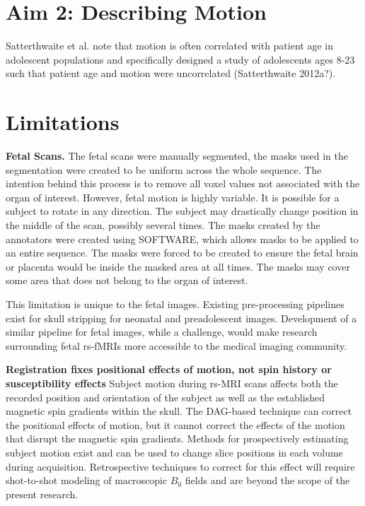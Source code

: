 \section{Aim 2: Describing Motion}

Satterthwaite et al. note that motion is often correlated with patient age in adolescent populations and specifically designed a study of adolescents ages 8-23 such that patient age and motion were uncorrelated (Satterthwaite 2012a?).

\section{Limitations}

\textbf{Fetal Scans.} The fetal scans were manually segmented, the masks used in the segmentation were created to be uniform across the whole sequence. The intention behind this process is to remove all voxel values not associated with the organ of interest. However, fetal motion is highly variable. It is possible for a subject to rotate in any direction. The subject may drastically change position in the middle of the scan, possibly several times. The masks created by the annotators were created using  SOFTWARE, which allows masks to be applied to an entire sequence. The masks were forced to be created to ensure the fetal brain or placenta would be inside the masked area at all times. The masks may cover some area that does not belong to the organ of interest.

This limitation is unique to the fetal images. Existing pre-processing pipelines exist for skull stripping for neonatal and preadolescent images. Development of a similar pipeline for fetal images, while a challenge, would make research surrounding fetal rs-fMRIs more accessible to the medical imaging community.

\textbf{Registration fixes positional effects of motion, not spin history or susceptibility effects}
Subject motion during rs-MRI scans affects both the recorded position and orientation of the subject as well as the established magnetic spin gradients within the skull. The DAG-based technique can correct the positional effects of motion, but it cannot correct the effects of the motion that disrupt the magnetic spin gradients. Methods for prospectively estimating subject motion exist and can be used to change slice positions in each volume during acquisition. Retrospective techniques to correct for this effect will require shot-to-shot modeling of macroscopic $B_0$ fields and are beyond the scope of the present research.
